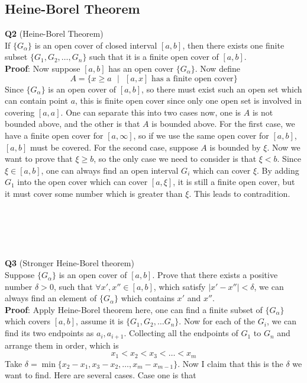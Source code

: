 \documentclass{article}
\newcommand{\tb}[1]{\textbf{#1}}
\newcommand{\al}{\alpha}
\begin{document}
\subsection{Heine-Borel Theorem}
\tb{Q2} (Heine-Borel Theorem)\\
If $\{G_\al\}$ is an open cover of closed interval $[a,b]$, then there exists one finite subset 
$\{G_1,G_2,\dots, G_n\}$ such that it is a finite open cover of $[a,b]$.\\
\tb{Proof}: Now suppose $[a,b]$ has an open cover $\{G_\al\}$. Now define 
$$
A = \{x \geq a\text{ }| \text{ }[a,x]\text{ has a finite open cover}\}
$$
Since $\{G_\al\}$ is an open cover of $[a,b]$, so there must exist such an open set which can contain point 
$a$, this is finite open cover since only one open set is involved in covering $[a,a]$. One can separate this into 
two cases now, one is $A$ is not bounded above, and the other is that $A$ is bounded above. For the first case, 
we have a finite open cover for $[a, \infty]$, so if we use the same open cover for $[a,b]$, $[a,b]$ must be covered. 
For the second case, suppose $A$ is bounded by $\xi$. Now we want to prove that $\xi \geq b$, so the only case we need to 
consider is that $\xi < b$. Since $\xi \in [a,b]$, one can always find an open interval $G_i$ which can cover $\xi$. 
By adding $G_1$ into the open cover which can cover $[a,\xi]$, it is still a finite open cover, but it must cover some number 
which is greater than $\xi$. This leads to contradition.\\
\\
\\
\\
\\
\\
\tb{Q3} (Stronger Heine-Borel theorem)\\
Suppose $\{G_\al\}$ is an open cover of $[a,b]$. Prove that there exists a positive number $\delta > 0$, such that $\forall x',x'' \in [a,b]$, which satisfy
$|x' - x''|< \delta$, we can always find an element of $\{G_\al\}$ which contains $x'$ and $x''$.\\
\tb{Proof}: Apply Heine-Borel theorem here, one can find a finite subset of $\{G_\al\}$ which covers $[a,b]$, assume it is $\{G_1, G_2, \dots G_n\}$. Now 
for each of the $G_i$, we can find its two endpoints as $a_i,a_{i+1}$. Collecting all the endpoints of $G_1$ to $G_n$ and arrange them in order, which is 
$$
x_1 < x_2 < x_3 < \dots < x_{m}
$$
Take $\delta = \min\{x_2 - x_1, x_3 - x_2, \dots ,x_m - x_{m-1}\}$. Now I claim that this is the $\delta$ we want to find. Here are several cases. Case one is that 
\end{document}
